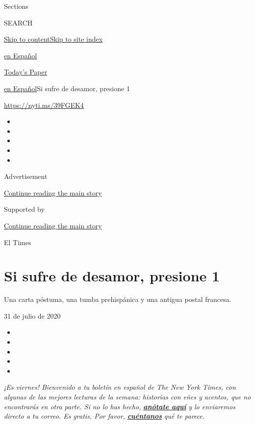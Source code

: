 Sections

SEARCH

\protect\hyperlink{site-content}{Skip to
content}\protect\hyperlink{site-index}{Skip to site index}

\href{https://www.nytimes3xbfgragh.onion/es/}{en Español}

\href{https://myaccount.nytimes3xbfgragh.onion/auth/login?response_type=cookie\&client_id=vi}{}

\href{https://www.nytimes3xbfgragh.onion/section/todayspaper}{Today's
Paper}

\href{/es/}{en Español}\textbar{}Si sufre de desamor, presione 1

\url{https://nyti.ms/39FGEK4}

\begin{itemize}
\item
\item
\item
\item
\item
\end{itemize}

Advertisement

\protect\hyperlink{after-top}{Continue reading the main story}

Supported by

\protect\hyperlink{after-sponsor}{Continue reading the main story}

El Times

\hypertarget{si-sufre-de-desamor-presione-1}{%
\section{Si sufre de desamor, presione
1}\label{si-sufre-de-desamor-presione-1}}

Una carta póstuma, una tumba prehispánica y una antigua postal francesa.

31 de julio de 2020

\begin{itemize}
\item
\item
\item
\item
\item
\end{itemize}

\emph{¡Es viernes! Bienvenido a tu boletín en español de The New York
Times, con algunas de las mejores lecturas de la semana: historias con
eñes y acentos, que no encontrarás en otra parte. Si no lo has hecho,}
\textbf{\href{https://www.nytimes3xbfgragh.onion/newsletters/el-times}{\emph{anótate
aquí}}} \emph{y lo enviaremos directo a tu correo. Es gratis. Por
favor,} \textbf{\href{mailto:comentarios@NYTimes.com}{\emph{cuéntanos}}}
\emph{qué te parece.}


